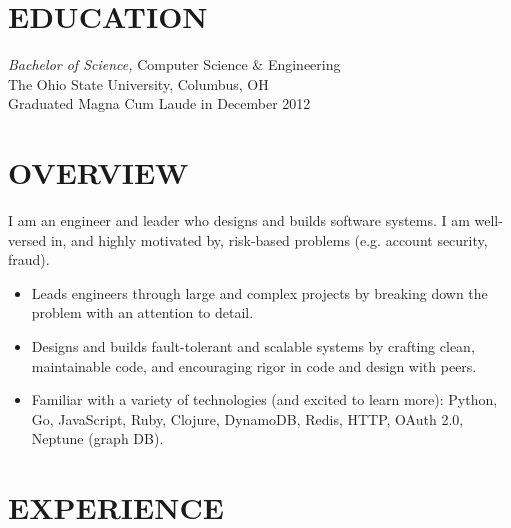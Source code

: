\documentclass[line]{resume}
\begin{document}
\address{\href{https://www.ryanmcg.com}{Personal website --- https://www.ryanmcg.com}}
\address{\href{mailto:ryan@ryanmcg.com}{ryan@ryanmcg.com}}


\begin{resume}
    \vspace{-12pt}
    \section{\uppercase{Education}}

    \vspace{6pt}
    {\sl Bachelor of Science,} Computer Science \& Engineering \\
    The Ohio State University, Columbus, OH \\
    Graduated Magna Cum Laude in December 2012 \\

    \vspace{-10pt}

    \section{\uppercase{Overview}}
    \vspace{6pt}

    I am an engineer and leader who designs and builds software systems.
    I am well-versed in, and highly motivated by, risk-based problems (e.g. account security, fraud).
    \vspace{6pt}
    \begin{itemize}
        \item Leads engineers through large and complex projects by breaking
            down the problem with an attention to detail.
        \item Designs and builds fault-tolerant and scalable systems by crafting
            clean, maintainable code, and encouraging rigor in code and design
            with peers.
        \item Familiar with a variety of technologies (and excited to learn
            more): Python, Go, JavaScript, Ruby, Clojure, DynamoDB, Redis, HTTP,
            OAuth 2.0, Neptune (graph DB).
    \end{itemize}

    \vspace{6pt}

    \section{\uppercase{Experience}}
    \vspace{6pt}


\end{resume}
\end{document}
